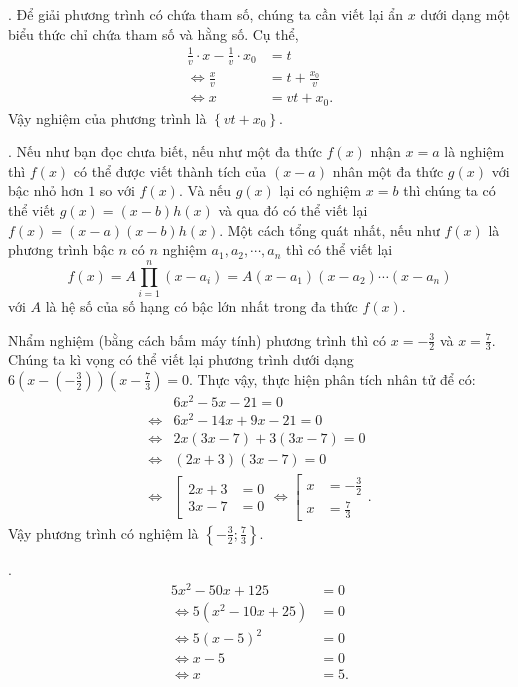 . Để giải phương trình có chứa tham số, chúng ta cần viết lại ẩn $x$ dưới dạng một biểu thức chỉ chứa tham số và hằng số. Cụ thể,
\begin{align*}
   \frac{1}{v}\cdot x - \frac{1}{v} \cdot x_0 &= t \\
   \iff \frac{x}{v} &= t + \frac{x_0}{v} \\
   \iff x &= vt + x_0.
\end{align*}
Vậy nghiệm của phương trình là $\displaystyle\left\{vt + x_0\right\}$.

. Nếu như bạn đọc chưa biết, nếu như một đa thức $f(x)$ nhận $x = a$ là nghiệm thì $f(x)$ có thể được viết thành tích của $(x - a)$ nhân một đa thức $g(x)$ với bậc nhỏ hơn $1$ so với $f(x)$. Và nếu $g(x)$ lại có nghiệm $x = b$ thì chúng ta có thể viết $g(x) = (x-b)h(x)$ và qua đó có thể viết lại $f(x) = (x-a)(x-b)h(x)$. Một cách tổng quát nhất, nếu như $f(x)$ là phương trình bậc $n$ có $n$ nghiệm $a_1, a_2, \cdots, a_n$ thì có thể viết lại $$f(x) = A \prod_{i=1}^{n} (x - a_i) = A(x - a_1)(x - a_2)\cdots (x - a_n)$$ với $A$ là hệ số của số hạng có bậc lớn nhất trong đa thức $f(x)$.

Nhẩm nghiệm (bằng cách bấm máy tính) phương trình thì có $x = -\frac{3}{2}$ và $x = \frac{7}{3}$. Chúng ta kì vọng có thể viết lại phương trình dưới dạng $6\left(x - \left(-\frac{3}{2}\right)\right)\left(x - \frac{7}{3}\right) = 0$. Thực vậy, thực hiện phân tích nhân tử để có:
\begin{align*}
   &6x^2 - 5x - 21 = 0 \\
   \iff &6x^2 - 14x + 9x - 21 = 0 \\
   \iff &2x(3x - 7) + 3(3x - 7) = 0 \\
   \iff &(2x + 3)(3x - 7) = 0 \\
   \iff &\left[
      \begin{aligned}
         2x + 3 &= 0 \\
         3x - 7 &= 0
      \end{aligned}
   \right.
   \iff \left[
      \begin{aligned}
         x &= -\frac{3}{2} \\
         x &= \frac{7}{3}
      \end{aligned}
   \right..
\end{align*}
Vậy phương trình có nghiệm là $\displaystyle\left\{-\frac{3}{2}; \frac{7}{3}\right\}$.

.
\begin{align*}
   5x^2 - 50x + 125 &= 0 \\
   \iff 5\left(x^2 - 10x + 25\right) &= 0 \\
   \iff 5(x - 5)^2 &= 0 \\
   \iff x - 5 &= 0 \\
   \iff x &= 5.
\end{align*}


